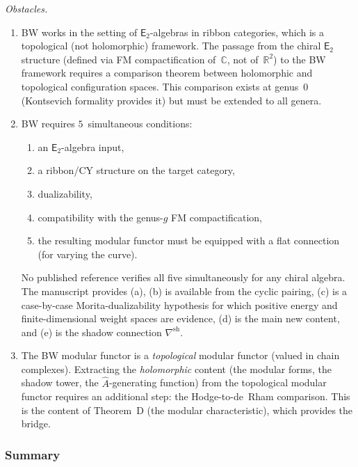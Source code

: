 \documentclass[11pt]{article}
\newcommand{\C}{\mathbb{C}}
\newcommand{\R}{\mathbb{R}}
\newcommand{\Etwo}{\mathsf{E}_2}
\begin{document}
\noindent\emph{Obstacles.}
\begin{enumerate}[label=\textup{(\alph*)},nosep]
\item BW works in the setting of $\Etwo$-algebras in
  ribbon categories, which is a topological (not holomorphic)
  framework.  The passage from the chiral $\Etwo$ structure
  (defined via FM compactification of~$\C$, not of~$\R^2$)
  to the BW framework requires a comparison theorem between
  holomorphic and topological configuration spaces.  This
  comparison exists at genus~$0$ (Kontsevich formality provides
  it) but must be extended to all genera.
\item BW requires $5$~simultaneous conditions:
  \begin{enumerate}[label=\textup{(\alph*)},nosep]
  \item an $\Etwo$-algebra input,
  \item a ribbon/CY structure on the target category,
  \item dualizability,
  \item compatibility with the genus-$g$ FM compactification,
  \item the resulting modular functor must be equipped with
    a flat connection (for varying the curve).
  \end{enumerate}
  No published reference verifies all five simultaneously for
  any chiral algebra.  The manuscript provides (a), (b) is
  available from the cyclic pairing, (c) is a case-by-case
  Morita-dualizability hypothesis for which positive energy and
  finite-dimensional weight spaces are evidence, (d) is the main
  new content, and (e) is the shadow connection
  $\nabla^{\mathrm{sh}}$.

\item The BW modular functor is a \emph{topological} modular
  functor (valued in chain complexes).  Extracting the
  \emph{holomorphic} content (the modular forms, the shadow
  tower, the $\hat{A}$-generating function) from the
  topological modular functor requires an additional step:
  the Hodge-to-de~Rham comparison.  This is the content of
  Theorem~D (the modular characteristic), which provides
  the bridge.
\end{enumerate}

\subsubsection*{Summary}
\label{par:ct2-summary}
\end{document}
